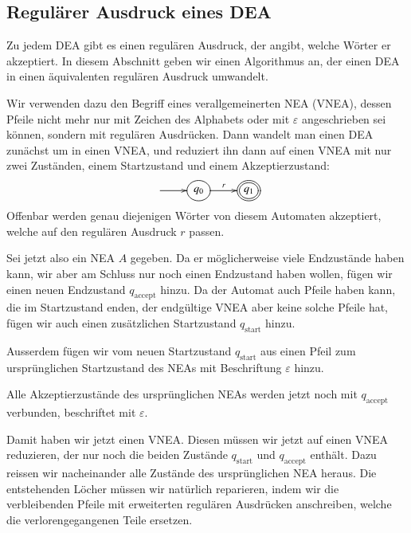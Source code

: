 \subsection{Regulärer Ausdruck eines DEA\label{regulaer:dea-re}}
Zu jedem DEA gibt es einen regulären Ausdruck, der angibt,
welche Wörter er akzeptiert.
In diesem Abschnitt geben
wir einen Algorithmus an, der einen DEA in einen äquivalenten
regulären Ausdruck umwandelt.

%
%
Wir verwenden dazu den Begriff eines verallgemeinerten NEA (VNEA),
dessen Pfeile nicht mehr nur mit Zeichen des Alphabets oder mit
$\varepsilon$ angeschrieben sei können, sondern mit regulären
Ausdrücken.
Dann wandelt man einen DEA zunächst um in einen
VNEA, und reduziert ihn dann auf einen VNEA mit nur zwei Zuständen,
einem Startzustand und einem Akzeptierzustand:
\[
\entrymodifiers={++[o][F]}
\xymatrix{
*+\txt{}\ar[r]
	&{q_0}\ar[r]^{r}
		&*++[o][F=]{q_1}
}
\]
Offenbar werden genau diejenigen Wörter von diesem Automaten
akzeptiert, welche auf den regulären Ausdruck $r$ passen.

Sei jetzt also ein NEA $A$ gegeben.
Da er möglicherweise viele
Endzustände haben kann, wir aber am Schluss nur noch einen
Endzustand haben wollen, fügen wir einen neuen Endzustand
$q_{\text{accept}}$ hinzu.
Da der Automat auch Pfeile haben kann, die im Startzustand enden,
der endgültige VNEA aber keine solche Pfeile hat, fügen wir
auch einen zusätzlichen Startzustand $q_{\text{start}}$ hinzu.


Ausserdem fügen wir vom neuen Startzustand $q_{\text{start}}$
aus einen Pfeil zum ursprünglichen Startzustand des NEAs mit Beschriftung $\varepsilon$ hinzu.

Alle Akzeptierzustände des ursprünglichen NEAs werden jetzt noch mit
$q_{\text{accept}}$ verbunden, beschriftet mit $\varepsilon$.

Damit haben wir jetzt einen VNEA.
Diesen müssen wir jetzt auf einen VNEA reduzieren, der nur noch
die beiden Zustände $q_{\text{start}}$ und $q_{\text{accept}}$
enthält.
Dazu reissen wir nacheinander alle Zustände des ursprünglichen
NEA heraus.
Die entstehenden Löcher müssen wir natürlich reparieren, indem wir die
verbleibenden Pfeile mit erweiterten regulären Ausdrücken
anschreiben, welche die verlorengegangenen Teile ersetzen.

